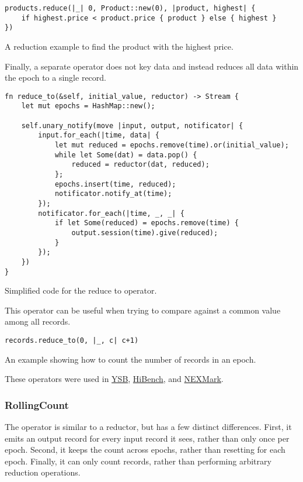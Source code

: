 \begin{listing}[H]
\begin{verbatim}
products.reduce(|_| 0, Product::new(0), |product, highest| {
    if highest.price < product.price { product } else { highest }
})
\end{verbatim}
\caption{A reduction example to find the product with the highest price.}
\label{lst:reduce-example}
\end{listing}

Finally, a separate  operator does not key data and instead reduces all data within the epoch to a single record.

\begin{listing}[H]
\begin{verbatim}
fn reduce_to(&self, initial_value, reductor) -> Stream {
    let mut epochs = HashMap::new();
    
    self.unary_notify(move |input, output, notificator| {
        input.for_each(|time, data| {
            let mut reduced = epochs.remove(time).or(initial_value);
            while let Some(dat) = data.pop() {
                reduced = reductor(dat, reduced);
            };
            epochs.insert(time, reduced);
            notificator.notify_at(time);
        });
        notificator.for_each(|time, _, _| {
            if let Some(reduced) = epochs.remove(time) {
                output.session(time).give(reduced);
            }
        });
    })
}
\end{verbatim}
  \caption{Simplified code for the reduce to operator.}
  \label{lst:reduce-to}
\end{listing}

This operator can be useful when trying to compare against a common value among all records.

\begin{listing}[H]
\begin{verbatim}
records.reduce_to(0, |_, c| c+1)
\end{verbatim}
\caption{An example showing how to count the number of records in an epoch.}
\label{lst:reduce-to-example}
\end{listing}

\noindent These operators were used in \hyperref[section:ysb]{YSB}, \hyperref[section:hibench]{HiBench}, and \hyperref[section:nexmark]{NEXMark}.

\subsubsection{RollingCount}
The  operator is similar to a reductor, but has a few distinct differences. First, it emits an output record for every input record it sees, rather than only once per epoch. Second, it keeps the count across epochs, rather than resetting for each epoch. Finally, it can only count records, rather than performing arbitrary reduction operations.

